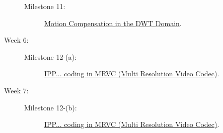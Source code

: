 \begin{description}
\begin{description}
  \item [Milestone 11:] \href{https://sistemas-multimedia.github.io/study_guide/11-MC_in_DWT_domain/}{Motion Compensation in the DWT Domain}.
  \end{description}
\item [Week 6:]
  \begin{description}
  \item [Milestone 12-(a):] \href{https://sistemas-multimedia.github.io/study_guide/12-IPP_coding/}{IPP... coding in MRVC (Multi Resolution Video Codec)}.
  \end{description}
\item [Week 7:]
  \begin{description}
  \item [Milestone 12-(b):] \href{https://sistemas-multimedia.github.io/study_guide/12-IPP_coding/}{IPP... coding in MRVC (Multi Resolution Video Codec)}.
  \end{description}
\end{description}
